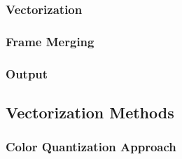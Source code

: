 \documentclass[12pt]{article}
\begin{document}

    \subsubsection{Vectorization}\label{subsubsec:vectorization}


    \subsubsection{Frame Merging}\label{subsubsec:frame-merging}


    \subsubsection{Output}\label{subsubsec:output}


    \subsection{Vectorization Methods}\label{subsec:vectorization-methods}


    \subsubsection{Color Quantization Approach}\label{subsubsec:color-quantization-approach}


\end{document}
